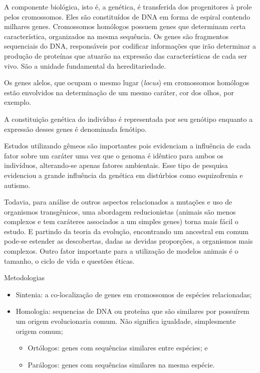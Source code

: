 \documentclass[
	article,			%
	12pt,				%
	oneside,			%
	a4paper,			%
	english,			%
	brazil,				%
	sumario=tradicional
	]{abntex2}
\begin{document}
A componente biológica, isto é, a genética, é transferida dos progenitores à prole pelos cromossomos.
Eles são constituídos de DNA em forma de espiral contendo milhares genes.
Cromossomos homólogos possuem genes que determinam certa característica, organizados na mesma sequência. Os genes são  fragmentos sequenciais do DNA, responsáveis por codificar informações que irão determinar a produção de proteínas que atuarão na expressão das características de cada ser vivo. São a unidade fundamental da hereditariedade.

Os genes alelos, que ocupam o mesmo lugar (\textit{locus}) em cromossomos homólogos estão envolvidos na determinação de um mesmo caráter, cor dos olhos, por exemplo.

A constituição genética do indivíduo é representada por seu genótipo enquanto a expressão desses genes é denominada fenótipo.




Estudos utilizando gêmeos são importantes pois evidenciam a influência de cada fator sobre um caráter uma vez que o genoma é idêntico para ambos os indivíduos, alterando-se apenas fatores ambientais. Esse tipo de pesquisa evidenciou a grande influência da genética em distúrbios como esquizofrenia e autismo.

Todavia, para análise de outros aspectos relacionados a mutações e uso de organismos transgênicos, uma abordagem reducionistas (animais são menos complexos e tem caráteres associados a um simples genes) torna mais fácil o estudo. E partindo da teoria da evolução, encontrando um ancestral em comum pode-se estender as descobertas, dadas as devidas proporções, a organismos mais complexos. Outro fator importante para a utilização de modelos animais é o tamanho, o ciclo de vida e questões éticas.

Metodologias
\begin{itemize}
    \item Sintenia:	a	co-localização	de	genes	em cromossomos	de	espécies relacionadas;
    \item Homologia:	sequencias	de	DNA	ou proteína	que	são similares	por	 possuírem	um	origem	evolucionaria comum. Não significa igualdade, simplesmente origem comum;
    \begin{itemize}
            \item Ortólogos:	genes	com	sequências	 similares	entre espécies; e
            \item Parálogos: genes	com	sequências	 similares	na	mesma espécie.
    \end{itemize}
\end{itemize}
	
\end{document}
